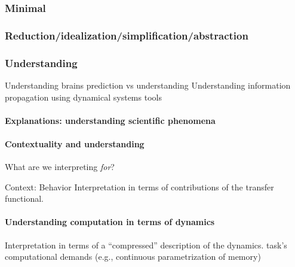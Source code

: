 \documentclass{article}
\theoremstyle{definition} \newtheorem{definition}{Definition}  \newtheorem{example}{Example}
\theoremstyle{remark} \newtheorem{remark}{Remark}
\newcounter{ct}
\begin{document}
\subsubsection{Minimal}
\citep{beer1996toward}
\citep{lafferriere2000minimal}
\citep{chirimuuta2014minimal}
\citep{batterman2014minimal}
\citep{brancazio2023minimal}
\citep{Jordan2019a}

\subsubsection{Reduction/idealization/simplification/abstraction}
\citep{marr1976computation, marr2010vision}
\citep{chirimuuta2018mmm} %
\citep{potochnik2021levels,
potochnik2020idealization,
potochnik2017idealization}
\citep{stinson2020idealized}
\citep{chirimuuta2024brain} 


\subsubsection{Understanding}\label{sec:understanding}
\citep{deregt2017understanding}
\citep{potochnik2017idealization}
\citep{guest2023logical}
%
Understanding brains \citep{marder2015understanding} \citep{lindsay2023testing} \citep{barman2024towards} \citep{dowling2018understanding}
prediction vs understanding \citep{chirimuuta2021prediction}
%
Understanding information propagation using dynamical systems tools \citep{vogt2022lyapunov}

\paragraph{Explanations: understanding scientific phenomena}
\citep{parascandolo2021learning}

\paragraph{Contextuality and understanding}
What are we interpreting \emph{for}?

Context: Behavior %
Interpretation in terms of contributions of the transfer functional.


\paragraph{Understanding computation in terms of dynamics}
Interpretation in terms of a ``compressed'' description of the dynamics.
%
task's computational demands (e.g., continuous parametrization of memory)
\end{document}
